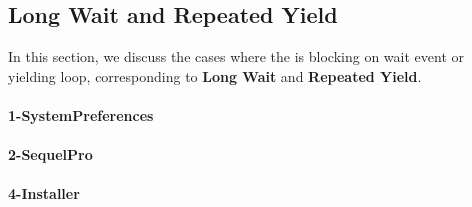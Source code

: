 \subsection{Long Wait and Repeated Yield}
In this section, we discuss the cases where the \spinningnode is blocking
on wait event or yielding loop, corresponding to \textbf{Long Wait} and
\textbf{Repeated Yield}.

%

\paragraph{1-SystemPreferences}



\paragraph{2-SequelPro}



\paragraph{4-Installer}


